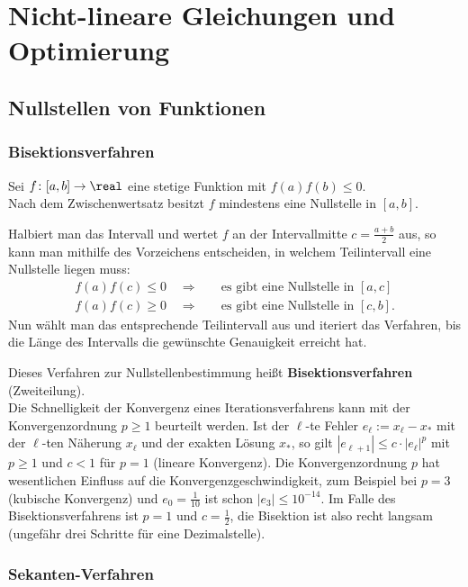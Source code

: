 \chapter{%
    Nicht-lineare Gleichungen und Optimierung%
}

\section{%
    Nullstellen von Funktionen%
}

\subsection{%
    Bisektionsverfahren%
}

Sei $f\colon [a, b] \rightarrow \real$ eine stetige Funktion mit
$f(a) f(b) \le 0$. \\
Nach dem Zwischenwertsatz besitzt $f$ mindestens eine Nullstelle
in $[a, b]$.

Halbiert man das Intervall und wertet $f$ an der Intervallmitte
$c = \frac{a + b}{2}$ aus, so kann man mithilfe des Vorzeichens entscheiden,
in welchem Teilintervall eine Nullstelle liegen muss:
\begin{align*}
    f(a)f(c) \le 0 \quad\Rightarrow &
    \quad\text{es gibt eine Nullstelle in } [a, c] \\
    f(a)f(c) \ge 0 \quad\Rightarrow &
    \quad\text{es gibt eine Nullstelle in } [c, b].
\end{align*}
Nun wählt man das entsprechende Teilintervall aus und iteriert das Verfahren,
bis die Länge des Intervalls die gewünschte Genauigkeit erreicht hat.

Dieses Verfahren zur Nullstellenbestimmung heißt \textbf{Bisektionsverfahren}
(Zweiteilung). \\
Die Schnelligkeit der Konvergenz eines Iterationsverfahrens kann mit
der Konvergenzordnung $p \ge 1$ beurteilt werden.
Ist der $\ell$-te Fehler $e_\ell := x_\ell - x_\ast$ mit der $\ell$-ten
Näherung $x_\ell$ und der exakten Lösung $x_\ast$, so gilt
$|e_{\ell+1}| \le c \cdot |e_\ell|^p$ mit $p \ge 1$ und
$c < 1$ für $p = 1$ (lineare Konvergenz).
Die Konvergenzordnung $p$ hat wesentlichen Einfluss auf die
Konvergenzgeschwindigkeit, zum Beispiel bei $p = 3$ (kubische Konvergenz)
und $e_0 = \frac{1}{10}$ ist schon $|e_3| \le 10^{-14}$.
Im Falle des Bisektionsverfahrens ist $p = 1$ und $c = \frac{1}{2}$,
die Bisektion ist also recht langsam
(ungefähr drei Schritte für eine Dezimalstelle).

\subsection{%
    Sekanten-Verfahren%
}

